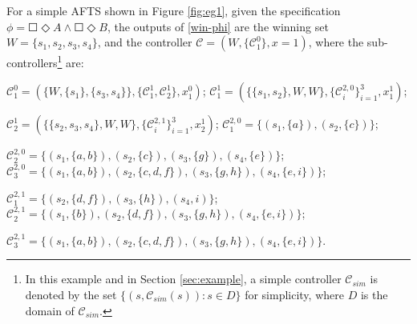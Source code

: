 \begin{example}
	\label{ex:exec}
	For a simple AFTS shown in Figure \ref{fig:eg1}, given the specification $ \phi = \Square \Diamond A \wedge \Square \Diamond B $, the outputs of \eqref{win-phi} are the winning set $ W= \{s_1,s_2,s_3,s_4\}$, and the controller $ \mathcal{C} = (W,\{\mathcal{C}^0_1\}, x = 1) $, where the sub-controllers\footnote{In this example and  in Section \ref{sec:example}, a simple controller $ \mathcal{C}_{sim} $ is denoted by the set $ \{(s,\mathcal{C}_{sim}(s)): s\in D\} $ for simplicity, where $ D $ is the domain of $ \mathcal{C}_{sim} $.}
	 are:
	
	\noindent$ \mathcal{C}^0_1 = (\{W,\{s_1\},\{s_3,s_4\}\},\{\mathcal{C}^1_1, \mathcal{C}^1_2\}, x^0_1 ) $; 
	$ \mathcal{C}^1_1 = (\{\{s_1,s_2\},W,W \},\{\mathcal{C}^{2,0}_i\}_{i=1}^3,x^1_1)$; 
	
	\noindent$ \mathcal{C}^1_2 = (\{\{s_2,s_3,s_4\},W,W \},\{\mathcal{C}^{2,1}_i\}_{i=1}^{3},x^1_2 )$; $ \mathcal{C}^{2,0}_1 = \{(s_1,\{a\}),(s_2,\{c\})\} $; 
	
	\noindent$ \mathcal{C}^{2,0}_2 = \{(s_1,\{a,b\}),(s_2,\{c\}),(s_3,\{g\}),(s_4,\{e\})\} $;
	$ \mathcal{C}^{2,0}_3 = \{(s_1,\{a,b\}),(s_2,\{c,d,f\}),(s_3,\{g,h\}),(s_4,\{e,i\})\} $; 
	
	\noindent$ \mathcal{C}^{2,1}_1 = \{(s_2,\{d,f\}),(s_3,\{h\}),(s_4,i)\} $; $ \mathcal{C}^{2,1}_2 = \{(s_1,\{b\}),(s_2,\{d,f\}), (s_3,\{g,h\}), (s_4,\{e,i\})\} $;
	
	\noindent$ \mathcal{C}^{2,1}_3 = \{(s_1,\{a,b\}),(s_2,\{c,d,f\}),(s_3,\{g,h\}),(s_4,\{e,i\})\} $.
	

\end{example}
